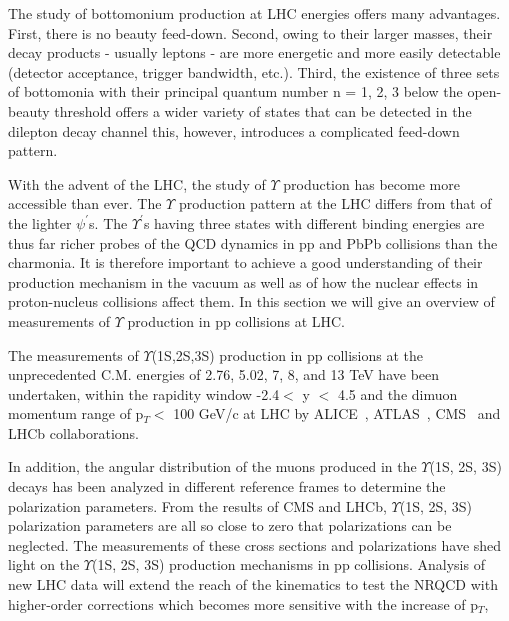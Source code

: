 


The study of bottomonium production at LHC energies offers many advantages. First, there is no beauty feed-down. Second,
owing to their larger masses, their decay products - usually leptons - are more energetic and more easily detectable
(detector acceptance, trigger bandwidth, etc.). Third, the existence of three sets of bottomonia with their principal
quantum number n = 1, 2, 3 below the open-beauty threshold offers a wider variety of states that can be detected in
the dilepton decay channel this, however, introduces a complicated feed-down pattern.



With the advent of the LHC, the study of $\Upsilon$ production has become more
accessible than ever. The $\Upsilon$ production pattern at the LHC differs from that
of the lighter $\psi^{'}$s. The $\Upsilon^{'}$s having three states with different binding
energies are thus far richer probes of the QCD dynamics in pp and PbPb collisions than
the charmonia. It is therefore important to achieve a good understanding of their
production mechanism in the vacuum as well as of how the nuclear effects in proton-nucleus
collisions affect them. In this section we will give an overview of measurements of $\Upsilon$
production in pp collisions at LHC. 

The measurements of $\Upsilon$(1S,2S,3S) production in pp collisions at the unprecedented C.M. energies
of 2.76, 5.02, 7, 8, and 13 TeV have been undertaken, within the rapidity window -2.4$<$ y $<$ 4.5
and the dimuon momentum range of p$_{T}<$ 100 GeV/c at LHC by ALICE~\cite{ATLAS:2011nal,ATLAS:2012lmu}, ATLAS~\cite{ATLAS:2011nal,ATLAS:2012lmu},
CMS~\cite{CMS:2013qur,CMS:2017dju} and LHCb collaborations.

In addition, the angular distribution of the muons produced in the $\Upsilon$(1S, 2S, 3S) decays has
been analyzed in different reference frames to determine the polarization parameters. From the results
of CMS and LHCb, $\Upsilon$(1S, 2S, 3S) polarization parameters are all so close to zero that polarizations
can be neglected. The measurements of these cross sections and polarizations have shed light on the
$\Upsilon$(1S, 2S, 3S) production mechanisms in pp collisions.
Analysis of new LHC data will extend the reach of the kinematics to test the NRQCD with
higher-order corrections which becomes more sensitive with the increase of p$_{T}$,












